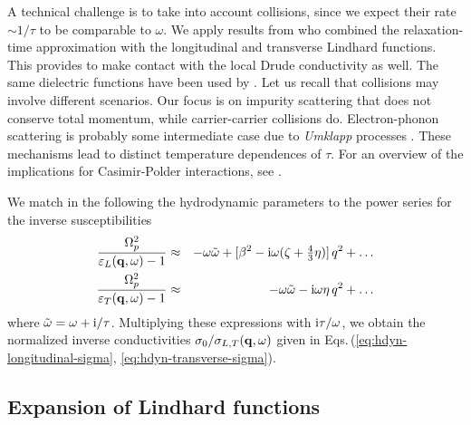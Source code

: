 \documentclass[11pt, oneside]{article}   	%
\def\OmegaP{\Omega_{p}}
\begin{document}
A technical challenge is to take into account
collisions, since we expect their rate $\sim 1/\tau$ to be comparable to $\omega$.
We apply results from \citet{Kliewer_1969a, Mermin_1970, Conti_1999} who combined the
relaxation-time approximation with the longitudinal and transverse Lindhard functions.
This provides to make contact with the local Drude conductivity as well. 
The same dielectric functions have been used by \citet{Reiche_2020a}.
Let us recall that collisions may involve different scenarios. Our focus is on 
impurity scattering that does not conserve total momentum, while carrier-carrier collisions
do. Electron-phonon scattering is probably some intermediate case due to \emph{Umklapp}
processes \cite{AshcroftMerminBook}. 
These mechanisms lead to distinct temperature dependences of $\tau$. For an overview of
the implications for Casimir-Polder interactions, see \citet{Reiche_2020a, Bordag_2017c}.

We match in the following the hydrodynamic parameters 
to the power series for the inverse susceptibilities
\begin{eqnarray}
\frac{ \OmegaP^2 }{ \varepsilon_{L}({\bf q}, \omega) - 1 }
& \approx &
- \omega \tilde\omega + [{\beta}^2 - {\rm i} \omega (\zeta + \tfrac43\eta) ] \, q^2
+ \ldots
\label{eq:appendix_long_wave_longitudinal_hd_epsilon} 
\\
\frac{ \OmegaP^2 }{ \varepsilon_{T}({\bf q}, \omega) - 1 }
& \approx &
- \omega\tilde{\omega} - {\rm i} \omega \eta \, q^2
+ \ldots
\label{eq:appendix_long_wave_transverse_hd_epsilon}
\end{eqnarray}
where $\tilde{\omega} = \omega + {\rm i}/\tau$. Multiplying these expressions with
${\rm i}\tau/\omega$, we obtain the normalized inverse conductivities 
$\sigma_0 / \sigma_{L,T}({\bf q}, \omega)$ given in
Eqs.\,(\ref{eq:hdyn-longitudinal-sigma}, \ref{eq:hdyn-transverse-sigma}).

\subsection{Expansion of Lindhard functions}
\label{sec:appendix_expansion_Lindhard_functions}
\end{document}
